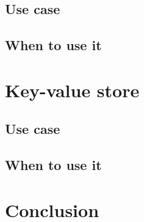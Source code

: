 \documentclass{CRPITStyle}
\begin{document}
\subsection{Use case}
\subsection{When to use it}

\section{Key-value store}

\subsection{Use case}
\subsection{When to use it}

\section{Conclusion}




\end{document}
